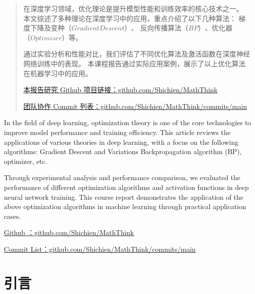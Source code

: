 \documentclass[printMode=true, declarePage=false]{ecnuthesis}
\date{} %
\begin{document}
    \tableofcontents

    \frontmatter

    \begin{abstract}
        在深度学习领域，优化理论是提升模型性能和训练效率的核心技术之一。
        本文综述了多种理论在深度学习中的应用，重点介绍了以下几种算法：
        梯度下降及变种$（Gradient Descent）$、
        反向传播算法$（BP）$、优化器$（Optimizer）$等。

        通过实验分析和性能对比，我们评估了不同优化算法及激活函数在深度神经网络训练中的表现。
        本课程报告通过实际应用案例，展示了以上优化算法在机器学习中的应用。

        \bigskip

        \href{https://github.com/Shichien/MathThink}{本报告研究 Github 项目链接：github.com/Shichien/MathThink}

        \href{https://github.com/Shichien/MathThink/commits/main}{团队协作 Commit 列表：github.com/Shichien/MathThink/commits/main}


    \end{abstract}

    \begin{abstractEN}
        In the field of deep learning, optimization theory is one of the core technologies to improve model performance and training efficiency.
        This article reviews the applications of various theories in deep learning, with a focus on the following algorithms:
        Gradient Descent and Variations
        Backpropagation algorithm (BP), optimizer, etc.
        
        Through experimental analysis and performance comparison, we evaluated the performance of different optimization algorithms and activation functions in deep neural network training.
        This course report demonstrates the application of the above optimization algorithms in machine learning through practical application cases.
        \bigskip

        \href{https://github.com/Shichien/MathThink}{Github ：github.com/Shichien/MathThink}

        \href{https://github.com/Shichien/MathThink/commits/main}{Commit List：github.com/Shichien/MathThink/commits/main}
    \end{abstractEN}

    \mainmatter


    \chapter{引言}
\end{document}
